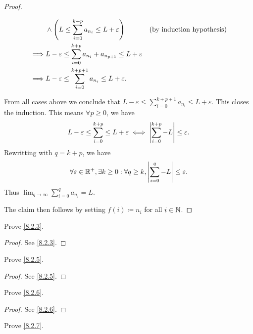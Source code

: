 \begin{proof}
\begin{itemize}
\begin{itemize}
\begin{align*}
				                     & \land \Bigg(L \leq \sum_{i = 0}^{k + p} a_{n_i} \leq L + \varepsilon\Bigg)                  &  & \text{(by induction hypothesis)}            \\
				            \implies & L - \varepsilon \leq \sum_{i = 0}^{k + p} a_{n_i} + a_{n_{p + 1}} \leq L + \varepsilon                            \\
				            \implies & L - \varepsilon \leq \sum_{i = 0}^{k + p + 1} a_{n_i} \leq L + \varepsilon.
			            \end{align*}
		      \end{itemize}
		      From all cases above we conclude that \(L - \varepsilon \leq \sum_{i = 0}^{k + p + 1} a_{n_i} \leq L + \varepsilon\).
		      This closes the induction.
		      This means \(\forall p \geq 0\), we have
		      \[
			      L - \varepsilon \leq \sum_{i = 0}^{k + p} \leq L + \varepsilon \iff \left\lvert\sum_{i = 0}^{k + p} - L\right\rvert \leq \varepsilon.
		      \]
		      Rewritting with \(q = k + p\), we have
		      \[
			      \forall \varepsilon \in \mathbb{R}^+, \exists k \geq 0 : \forall q \geq k, \left\lvert\sum_{i = 0}^q - L\right\rvert \leq \varepsilon.
		      \]
		      Thus \(\lim_{q \to \infty} \sum_{i = 0}^q a_{n_i} = L\).
	\end{itemize}
	The claim then follows by setting \(f(i) \coloneqq n_i\) for all \(i \in \mathbb{N}\).
\end{proof}

\exercisesection

\begin{ex}\label{ex:8.2.1}
	Prove \cref{8.2.3}.
\end{ex}

\begin{proof}
	See \cref{8.2.3}.
\end{proof}

\begin{ex}\label{ex:8.2.2}
	Prove \cref{8.2.5}.
\end{ex}

\begin{proof}
	See \cref{8.2.5}.
\end{proof}

\begin{ex}\label{ex:8.2.3}
	Prove \cref{8.2.6}.
\end{ex}

\begin{proof}
	See \cref{8.2.6}.
\end{proof}

\begin{ex}\label{ex:8.2.4}
	Prove \cref{8.2.7}.
\end{ex}

